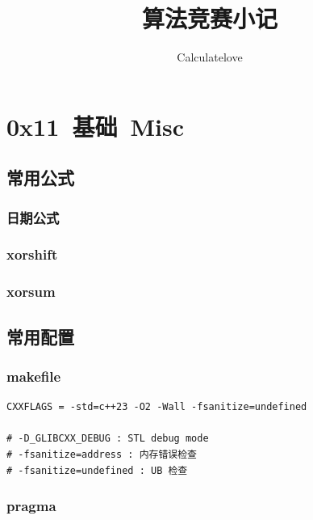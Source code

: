 \documentclass{article}
\title{算法竞赛小记}
\author{Calculatelove}
\date{}
\begin{document}
\maketitle

\tableofcontents

\section{0x11\ 基础\ Misc}

\subsection{常用公式}

\subsubsection{日期公式}


\subsubsection{xorshift}


\subsubsection{xorsum}


\subsection{常用配置}

\subsubsection{makefile}

\begin{verbatim}
CXXFLAGS = -std=c++23 -O2 -Wall -fsanitize=undefined

# -D_GLIBCXX_DEBUG : STL debug mode
# -fsanitize=address : 内存错误检查
# -fsanitize=undefined : UB 检查
\end{verbatim}

\subsubsection{pragma}
\end{document}
